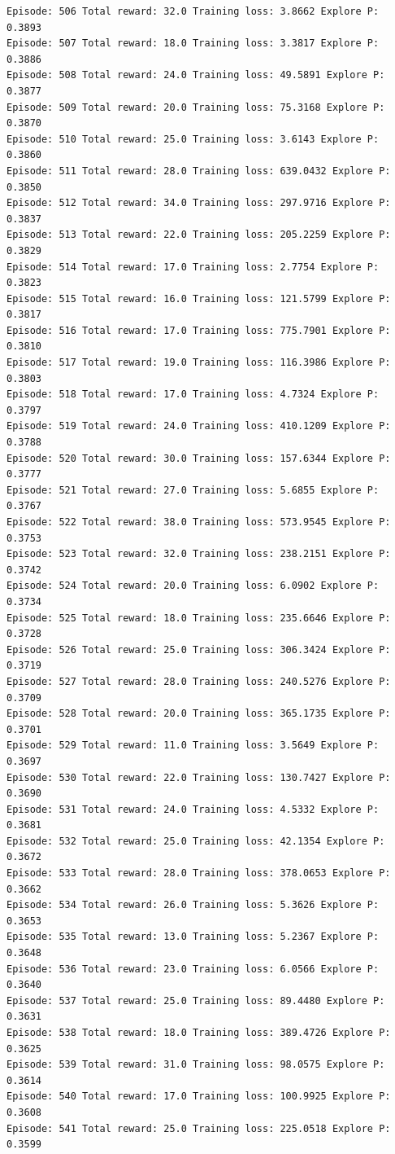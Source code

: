 \documentclass[11pt]{article}
\begin{document}
\begin{Verbatim}[commandchars=\\\{\}]
Episode: 506 Total reward: 32.0 Training loss: 3.8662 Explore P: 0.3893
Episode: 507 Total reward: 18.0 Training loss: 3.3817 Explore P: 0.3886
Episode: 508 Total reward: 24.0 Training loss: 49.5891 Explore P: 0.3877
Episode: 509 Total reward: 20.0 Training loss: 75.3168 Explore P: 0.3870
Episode: 510 Total reward: 25.0 Training loss: 3.6143 Explore P: 0.3860
Episode: 511 Total reward: 28.0 Training loss: 639.0432 Explore P: 0.3850
Episode: 512 Total reward: 34.0 Training loss: 297.9716 Explore P: 0.3837
Episode: 513 Total reward: 22.0 Training loss: 205.2259 Explore P: 0.3829
Episode: 514 Total reward: 17.0 Training loss: 2.7754 Explore P: 0.3823
Episode: 515 Total reward: 16.0 Training loss: 121.5799 Explore P: 0.3817
Episode: 516 Total reward: 17.0 Training loss: 775.7901 Explore P: 0.3810
Episode: 517 Total reward: 19.0 Training loss: 116.3986 Explore P: 0.3803
Episode: 518 Total reward: 17.0 Training loss: 4.7324 Explore P: 0.3797
Episode: 519 Total reward: 24.0 Training loss: 410.1209 Explore P: 0.3788
Episode: 520 Total reward: 30.0 Training loss: 157.6344 Explore P: 0.3777
Episode: 521 Total reward: 27.0 Training loss: 5.6855 Explore P: 0.3767
Episode: 522 Total reward: 38.0 Training loss: 573.9545 Explore P: 0.3753
Episode: 523 Total reward: 32.0 Training loss: 238.2151 Explore P: 0.3742
Episode: 524 Total reward: 20.0 Training loss: 6.0902 Explore P: 0.3734
Episode: 525 Total reward: 18.0 Training loss: 235.6646 Explore P: 0.3728
Episode: 526 Total reward: 25.0 Training loss: 306.3424 Explore P: 0.3719
Episode: 527 Total reward: 28.0 Training loss: 240.5276 Explore P: 0.3709
Episode: 528 Total reward: 20.0 Training loss: 365.1735 Explore P: 0.3701
Episode: 529 Total reward: 11.0 Training loss: 3.5649 Explore P: 0.3697
Episode: 530 Total reward: 22.0 Training loss: 130.7427 Explore P: 0.3690
Episode: 531 Total reward: 24.0 Training loss: 4.5332 Explore P: 0.3681
Episode: 532 Total reward: 25.0 Training loss: 42.1354 Explore P: 0.3672
Episode: 533 Total reward: 28.0 Training loss: 378.0653 Explore P: 0.3662
Episode: 534 Total reward: 26.0 Training loss: 5.3626 Explore P: 0.3653
Episode: 535 Total reward: 13.0 Training loss: 5.2367 Explore P: 0.3648
Episode: 536 Total reward: 23.0 Training loss: 6.0566 Explore P: 0.3640
Episode: 537 Total reward: 25.0 Training loss: 89.4480 Explore P: 0.3631
Episode: 538 Total reward: 18.0 Training loss: 389.4726 Explore P: 0.3625
Episode: 539 Total reward: 31.0 Training loss: 98.0575 Explore P: 0.3614
Episode: 540 Total reward: 17.0 Training loss: 100.9925 Explore P: 0.3608
Episode: 541 Total reward: 25.0 Training loss: 225.0518 Explore P: 0.3599

\end{Verbatim}
\end{document}
